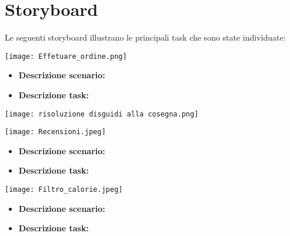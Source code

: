 \documentclass{article}
\begin{document}
    \vspace{1cm}




    \vspace{4cm}

\section{Storyboard} \par
Le seguenti storyboard illustrano le principali task che sono state individuate:
\vspace{1cm}
\begin{center}
    \texttt{[image: Effetuare\_ordine.png]}
\end{center}
\begin{itemize}
    \item \textbf{Descrizione scenario:}
    \item \textbf{Descrizione task:}
\end{itemize}
\begin{center}
    \texttt{[image: risoluzione disguidi alla cosegna.png]}
\end{center}

\begin{center}
    \texttt{[image: Recensioni.jpeg]}
\end{center}

\begin{itemize}
    \item \textbf{Descrizione scenario:}
    \item \textbf{Descrizione task:}
\end{itemize}

\begin{center}
    \texttt{[image: Filtro\_calorie.jpeg]}
\end{center}
\begin{itemize}
    \item \textbf{Descrizione scenario:}
    \item \textbf{Descrizione task:}
\end{itemize}
\end{document}
